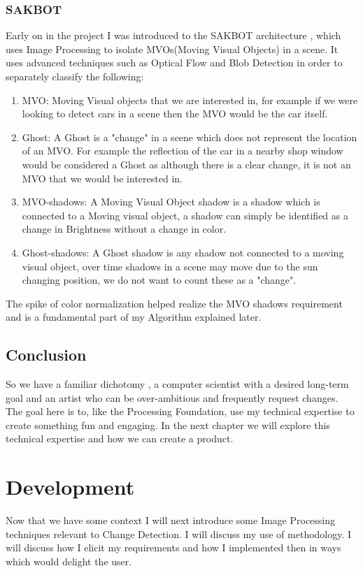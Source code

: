 \documentclass[a4paper]{report}
\begin{document}
\subsection{SAKBOT}
Early on in the project I was introduced to the SAKBOT architecture \cite{SAKBOT}, which uses Image Processing to isolate MVOs(Moving Visual Objects) in a scene. It uses advanced techniques such as Optical Flow and Blob Detection in order to separately classify the following:
\begin{enumerate}
  \item MVO: Moving Visual objects that we are interested in, for example if we were looking to detect cars in a scene then the MVO would be the car itself.
  \item Ghost: A Ghost is a "change" in a scene which does not represent the location of an MVO. For example the reflection of the car in a nearby shop window would be considered a Ghost as although there is a clear change, it is not an MVO that we would be interested in.
  \item MVO-shadows: A Moving Visual Object shadow is a shadow which is connected to a Moving visual object, a shadow can simply be identified as a change in Brightness without a change in color.
  \item Ghost-shadows: A Ghost shadow is any shadow not connected to a moving visual object, over time shadows in a scene may move due to the sun changing position, we do not want to count these as a "change".
\end{enumerate}

The spike of color normalization helped realize the MVO shadows requirement and is a fundamental part of my Algorithm explained later.

\section{Conclusion}
So we have a familiar dichotomy , a computer scientist with a desired long-term goal and an artist who can be over-ambitious and frequently request changes. The goal here is to, like the Processing Foundation, use my technical expertise to create something fun and engaging. In the next chapter we will explore this technical expertise and how we can create a product.

\chapter{Development}
Now that we have some context I will next introduce some Image Processing techniques relevant to Change Detection. I will discuss my use of methodology. I will discuss how I elicit my requirements and how I implemented then in ways which would delight the user.
\end{document}

